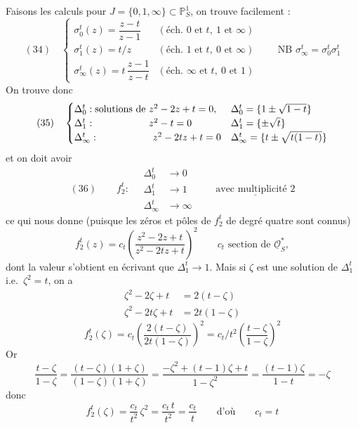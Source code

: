 \documentclass[11pt,a4paper]{article}
\begin{document}
Faisons les calculs pour $J = \{0, 1, \infty\} \subset \mathbb{P}^1_S$,
on trouve facilement :
\[
  (34) \quad
  \begin{cases}
    \sigma_0^t(z) = \dfrac{z - t}{z - 1} & (\text{éch.\ } 0 \text{ et } t,\ 1 \text{ et } \infty) \\[1ex]
    \sigma_1^t(z) = t/z & (\text{éch.\ } 1 \text{ et } t,\ 0 \text{ et } \infty) \\[1ex]
    \sigma_\infty^t(z) = t\,\dfrac{z - 1}{z - t} & (\text{éch.\ } \infty \text{ et } t,\ 0 \text{ et } 1)
  \end{cases}
  \qquad \text{NB } \sigma_\infty^t = \sigma_0^t \sigma_1^t
\]
On trouve donc
\[
  (35) \quad
  \begin{cases}
    \Delta_0^t : \text{solutions de } z^2 - 2z + t = 0, & \Delta_0^t = \{1 \pm \sqrt{1-t}\} \\
    \Delta_1^t : \text{\phantom{solutions de }} z^2 - t = 0 & \Delta_1^t = \{\pm \sqrt{t}\} \\
    \Delta_\infty^t : \text{\phantom{solutions de }} z^2 - 2tz + t = 0 & \Delta_\infty^t = \{t \pm \sqrt{t(1-t)}\}
  \end{cases}
\]
et on doit avoir
\[
  (36) \qquad f_2^t : \quad
  \begin{aligned}
    \Delta_0^t &\longrightarrow 0 \\
    \Delta_1^t &\longrightarrow 1 \\
    \Delta_\infty^t &\longrightarrow \infty
  \end{aligned}
  \qquad \underline{\text{avec multiplicité } 2}
\]
ce qui nous donne (puisque les zéros et pôles de $f_2^t$ de degré quatre
sont connus)
\[
  f_2^t(z) = c_t \left( \frac{z^2 - 2z + t}{z^2 - 2tz + t} \right)^2
  \qquad c_t \text{ section de } \underline{\mathcal{O}}_S^*,
\]
dont la valeur s'obtient en écrivant que $\Delta_1^t \to 1$. Mais si $\zeta$
est une solution de $\Delta_1^t$ i.e.\ $\zeta^2 = t$, on a
\[
  \begin{aligned}
    \zeta^2 - 2\zeta + t &= 2(t - \zeta) \\
    \zeta^2 - 2t\zeta + t &= 2t(1 - \zeta)
  \end{aligned}
\]
\[
  f_2^t(\zeta) = c_t \left( \frac{2(t - \zeta)}{2t(1 - \zeta)} \right)^2
  = c_t/t^2 \left( \frac{t - \zeta}{1 - \zeta} \right)^2
\]
Or 
\[
  \frac{t - \zeta}{1 - \zeta}
  = \frac{(t - \zeta)(1 + \zeta)}{(1 - \zeta)(1 + \zeta)}
  = \frac{-\zeta^2 + (t-1)\zeta + t}{1 - \zeta^2}
  = \frac{(t-1)\zeta}{1 - t} = -\zeta
\]
donc
\[
  f_2^t(\zeta) = \frac{c_t}{t^2}\, \zeta^2 = \frac{c_t\, t}{t^2} = \frac{c_t}{t}
  \qquad \text{d'où} \qquad c_t = t
\]
\end{document}
